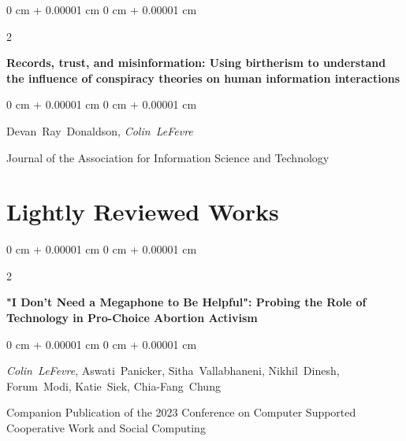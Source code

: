 \documentclass[10pt, letterpaper]{article}
\newenvironment{onecolentry}{
    \begin{adjustwidth}{
        0 cm + 0.00001 cm
    }{
        0 cm + 0.00001 cm
    }
}{
    \end{adjustwidth}
} %
\newenvironment{twocolentry}[2][]{
    \onecolentry
    \def\secondColumn{#2}
    \setcolumnwidth{\fill, 4.0 cm}
    \begin{paracol}{2}
}{
    \switchcolumn \raggedleft \secondColumn
    \end{paracol}
    \endonecolentry
} %
\begin{document}
        
        \begin{samepage}
            \begin{twocolentry}{
                2022
            }
                \textbf{Records, trust, and misinformation: Using birtherism to understand the influence of conspiracy theories on human information interactions}
            \end{twocolentry}

            \vspace{0.10 cm}
            
            \begin{onecolentry}
                \mbox{Devan Ray Donaldson}, \mbox{\textit{Colin LeFevre}}

                \vspace{0.10 cm}
                
        Journal of the Association for Information Science and Technology\end{onecolentry}
        \end{samepage}


    
    \section{Lightly Reviewed Works}



        
        \begin{samepage}
            \begin{twocolentry}{
                2023
            }
                \textbf{"I Don’t Need a Megaphone to Be Helpful": Probing the Role of Technology in Pro-Choice Abortion Activism}
            \end{twocolentry}

            \vspace{0.10 cm}
            
            \begin{onecolentry}
                \mbox{\textit{Colin LeFevre}}, \mbox{Aswati Panicker}, \mbox{Sitha Vallabhaneni}, \mbox{Nikhil Dinesh}, \mbox{Forum Modi}, \mbox{Katie Siek}, \mbox{Chia-Fang Chung}

                \vspace{0.10 cm}
                
        Companion Publication of the 2023 Conference on Computer Supported Cooperative Work and Social Computing\end{onecolentry}
        \end{samepage}
\end{document}
